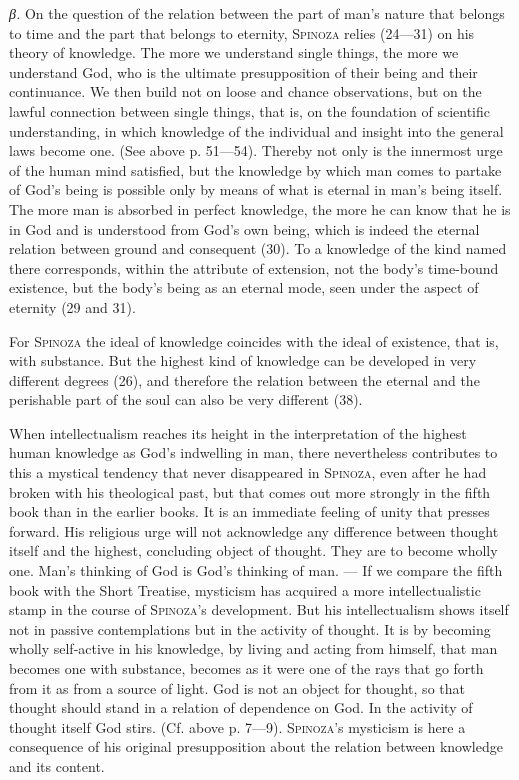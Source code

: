 \documentclass[12pt]{article}
\newcommand{\opage}[1]{\marginnote{\footnotesize\textit{[#1]}}}
\begin{document}
\textit{β.} On the question of the relation between the part of man's nature that belongs to time
and the part that belongs to eternity, \textsc{Spinoza} relies (24---31) on his theory of knowledge.
The more we understand single things, the more we understand God, who is the ultimate
presupposition of their being and their continuance. We then build not on loose and chance
observations, but on the lawful connection between single things, that is, on the foundation of
scientific understanding, in which knowledge of the individual and insight into the general laws
become one. (See above p. 51---54). Thereby not only is the innermost urge of the human mind
satisfied, but the knowledge by which man comes to partake of God's being is possible only by means
of what is eternal in man's being itself. The more man is absorbed in perfect knowledge, the more
he can know that he is in God and is understood from God's own being, which is indeed the eternal
relation between ground and consequent (30). To a knowledge of the kind named there corresponds,
within the attribute of extension, not the body's time-bound existence, but the body's being as an
eternal mode, seen under the aspect of eternity (29 and 31).

For \textsc{Spinoza} the ideal of knowledge coincides with the ideal of existence, that is, with
substance. But the highest kind of knowledge can be developed in very different degrees (26), and
therefore the relation between the eternal and the perishable part of the soul can also be very
different (38).

When intellectualism reaches its height in the interpretation of the highest human knowledge as
God's indwelling in man, there nevertheless contributes to this a mystical tendency that never
disappeared in \textsc{Spinoza}, even after he had broken \opage{91}with his theological past, but
that comes out more strongly in the fifth book than in the earlier books. It is an immediate feeling
of unity that presses forward. His religious urge will not acknowledge any difference between
thought itself and the highest, concluding object of thought. They are to become wholly one. Man's
thinking of God is God's thinking of man. --- If we compare the fifth book with the Short Treatise,
mysticism has acquired a more intellectualistic stamp in the course of \textsc{Spinoza}'s
development. But his intellectualism shows itself not in passive contemplations but in the activity
of thought. It is by becoming wholly self-active in his knowledge, by living and acting from
himself, that man becomes one with substance, becomes as it were one of the rays that go forth from
it as from a source of light. God is not an object for thought, so that thought should stand in a
relation of dependence on God. In the activity of thought itself God stirs. (Cf. above p. 7---9).
\textsc{Spinoza}'s mysticism is here a consequence of his original presupposition about the
relation between knowledge and its content.
\end{document}
